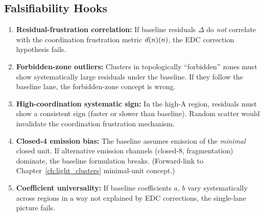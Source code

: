 \subsection{Falsifiability Hooks}

\begin{edcopenbox}[title=Falsifiability Hooks]
    \begin{enumerate}
        \item \textbf{Residual-frustration correlation:}
              If baseline residuals $\Delta$ do \emph{not} correlate with
              the coordination frustration metric $d(n)(n)$,
              the EDC correction hypothesis fails.

        \item \textbf{Forbidden-zone outliers:}
              Clusters in topologically ``forbidden'' zones must show
              systematically large residuals under the baseline. If they
              follow the baseline lane, the forbidden-zone concept is wrong.

        \item \textbf{High-coordination systematic sign:}
              In the high-A region, residuals must show a consistent
              sign (faster or slower than baseline). Random scatter would
              invalidate the coordination frustration mechanism.

        \item \textbf{Closed-4 emission bias:}
              The baseline assumes emission of the \emph{minimal} closed unit.
              If alternative emission channels (closed-8, fragmentation)
              dominate, the baseline formulation breaks.
              (Forward-link to Chapter~\ref{ch:light_clusters} minimal-unit
              concept.)

        \item \textbf{Coefficient universality:}
              If baseline coefficients $a$, $b$ vary systematically across
              regions in a way not explained by EDC corrections, the
              single-lane picture fails.
    \end{enumerate}
\end{edcopenbox}


